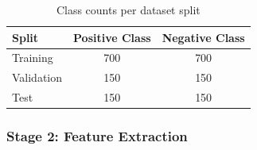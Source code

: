 \begin{enumerate}[label=\roman*., topsep=0pt, itemsep=2pt]
            \begin{table}[htbp]
            \caption{Class counts per dataset split}
            \centering
            \begin{tabular}{lcc}
            \hline
            \textbf{Split} & \textbf{Positive Class} & \textbf{Negative Class} \\
            \hline
            Training   & 700 & 700 \\
            Validation & 150 & 150 \\
            Test       & 150 & 150 \\
            \hline
            \end{tabular}
            \label{class_counts}
            \end{table}
\end{enumerate}

\newpage

\subsubsection{Stage 2: Feature Extraction}

